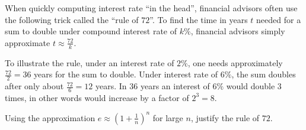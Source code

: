 \begin{frame}
\begin{example}
When quickly computing interest rate ``in the head'', financial advisors often use the following trick called the ``rule of $72$''. To find the time in years $t$ needed for a sum to double under compound interest rate of $k\%$, financial advisors simply approximate $t\approx \frac{72}{k}$. 

To illustrate the rule, under an interest rate of $2\%$, one needs approximately $\frac{72}{2}=36$ years for the sum to double. Under interest rate of $6\%$, the sum doubles after only about $\frac{72}{6}=12$ years. In $36$ years an interest of $6\%$ would double $3$ times, in other words would increase by a factor of $2^3=8$.


Using the approximation $e\approx \left(1+\frac{1}{n}\right)^n$ for large $n$, justify the rule of $72$.


\end{example}


\end{frame}